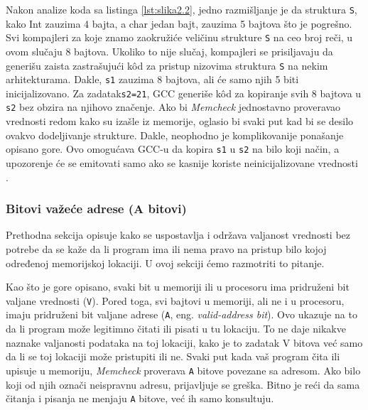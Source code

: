 \documentclass[12pt,oneside]{memoir}
\theoremstyle{plain}
\theoremstyle{definition}
\begin{document}
Nakon analize koda sa listinga \ref{lst:slika2.2}, jedno razmišljanje je da struktura \texttt{S}, kako Int zauzima 4 bajta, a char jedan bajt, zauzima 5 bajtova što je pogrešno. Svi kompajleri za koje znamo zaokružiće veličinu strukture \texttt{S} na ceo broj reči, u ovom slučaju 8 bajtova. Ukoliko to nije slučaj, kompajleri  se prisiljavaju da generišu zaista zastrašujući k\^od za pristup nizovima struktura \texttt{S} na nekim arhitekturama. Dakle, \texttt{s1} zauzima 8 bajtova, ali će samo njih 5 biti inicijalizovano. Za zadatak\texttt{s2=21}, GCC generiše k\^od za kopiranje svih 8 bajtova u \texttt{s2} bez obzira na njihovo značenje. Ako bi \textit{Memcheck} jednostavno proveravao vrednosti redom kako su izašle iz memorije, oglasio bi svaki put kad bi se desilo ovakvo dodeljivanje strukture. Dakle, neophodno je komplikovanije ponašanje opisano gore. Ovo omogućava GCC-u da kopira \texttt{s1} u \texttt{s2} na bilo koji način, a upozorenje će se emitovati samo ako se kasnije koriste neinicijalizovane vrednosti \cite{Memcheck}. 

\subsubsection{Bitovi važeće adrese (A bitovi)}
Prethodna sekcija opisuje kako se uspostavlja i održava valjanost vrednosti bez potrebe da se kaže da li program ima ili nema pravo na pristup bilo kojoj određenoj memorijskoj lokaciji. U ovoj sekciji ćemo razmotriti to pitanje.

Kao što je gore opisano, svaki bit u memoriji ili u procesoru ima pridruženi bit valjane vrednosti (\texttt{V}). Pored toga, svi bajtovi u memoriji, ali ne i u procesoru, imaju pridruženi bit valjane adrese (\texttt{A}, eng. \textit{valid-address bit}). Ovo ukazuje na to da li program može legitimno čitati ili pisati u tu lokaciju. To ne daje nikakve naznake valjanosti podataka na toj lokaciji, kako je to zadatak V bitova već samo da li se toj lokaciji može pristupiti ili ne. Svaki put kada vaš program čita ili upisuje u memoriju, \textit{Memcheck} proverava \texttt{A} bitove povezane sa adresom. Ako bilo koji od njih označi neispravnu adresu, prijavljuje se greška. Bitno je reći da sama čitanja i pisanja ne menjaju \texttt{A} bitove, već ih samo konsultuju.
\end{document}
